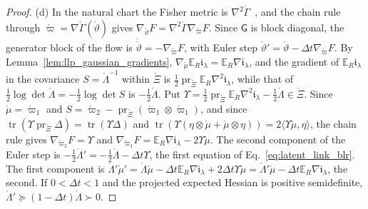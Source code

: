 \begin{proof}
(d) In the natural chart the Fisher metric is $\nabla^2\mathring\Gamma$~\cite{Brown1986}, and the chain rule through $\mathring\varpi=\nabla\mathring\Gamma(\mathring\vartheta)$ gives $\nabla_{\mathring\vartheta}F=\nabla^2\mathring\Gamma\nabla_{\mathring\varpi}F$. Since $\mathsf G$ is block diagonal, the generator block of the flow is $\dot{\mathring\vartheta}=-\nabla_{\mathring\varpi}F$, with Euler step $\mathring\vartheta'=\mathring\vartheta-\Delta t\nabla_{\mathring\varpi}F$. By Lemma~\ref{lem:llp_gaussian_gradients}, $\nabla_{\mathring\mu}\mathbb E_R\mathfrak i_\lambda=\mathbb E_R\nabla\mathfrak i_\lambda$, and the gradient of $\mathbb E_R\mathfrak i_\lambda$ in the covariance $S=\mathring\Lambda^{-1}$ within $\mathring\Xi$ is $\frac12\operatorname{pr}_{\mathring\Xi}\mathbb E_R\nabla^2\mathfrak i_\lambda$, while that of $\frac12\log\det\mathring\Lambda=-\frac12\log\det S$ is $-\frac12\mathring\Lambda$. Put $\Upsilon=\frac12\operatorname{pr}_{\mathring\Xi}\mathbb E_R\nabla^2\mathfrak i_\lambda-\frac12\mathring\Lambda\in\mathring\Xi$. Since $\mathring\mu=\mathring\varpi_1$ and $S=\mathring\varpi_2-\operatorname{pr}_{\mathring\Xi}(\mathring\varpi_1\otimes\mathring\varpi_1)$, and since $\operatorname{tr}(\Upsilon\operatorname{pr}_{\mathring\Xi}\Delta)=\operatorname{tr}(\Upsilon\Delta)$ and $\operatorname{tr}(\Upsilon(\eta\otimes\mathring\mu+\mathring\mu\otimes\eta))=2\langle\Upsilon\mathring\mu,\eta\rangle$, the chain rule gives $\nabla_{\mathring\varpi_2}F=\Upsilon$ and $\nabla_{\mathring\varpi_1}F=\mathbb E_R\nabla\mathfrak i_\lambda-2\Upsilon\mathring\mu$. The second component of the Euler step is $-\frac12\mathring\Lambda'=-\frac12\mathring\Lambda-\Delta t\Upsilon$, the first equation of Eq.~\eqref{eq:latent_link_blr}. The first component is $\mathring\Lambda'\mathring\mu'=\mathring\Lambda\mathring\mu-\Delta t\mathbb E_R\nabla\mathfrak i_\lambda+2\Delta t\Upsilon\mathring\mu=\mathring\Lambda'\mathring\mu-\Delta t\mathbb E_R\nabla\mathfrak i_\lambda$, the second. If $0<\Delta t<1$ and the projected expected Hessian is positive semidefinite, $\mathring\Lambda'\succeq(1-\Delta t)\mathring\Lambda\succ0$.

\end{proof}
